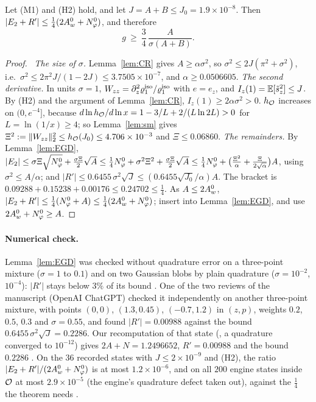 \begin{theorem}\label{thm:EGO}
Let \textup{(M1)} and \textup{(H2)} hold, and let $J=A+B\le J_0=1.9\times10^{-8}$. Then $|E_2+R'|\le\frac14(2A_w^0+N_\varphi^0)$, and therefore
\[
g\ \ge\ \frac34\,\frac{A}{\sigma(A+B)} .
\]
\end{theorem}
\begin{proof}\proofst\
\emph{The size of $\sigma$.} Lemma~\ref{lem:CR} gives $A\ge\alpha\sigma^2$, so $\sigma^2\le2J(\pi^2+\sigma^2)$, i.e.\ $\sigma^2\le2\pi^2J/(1-2J)\le3.7505\times10^{-7}$, and $\alpha\ge0.0506605$.
\emph{The second derivative.} In units $\sigma=1$, $W_{zz}=\partial_z^2\varrho^{\rm iso}_1/\varrho^{\rm iso}_1$ with $e=e_z$, and $I_z(1)=\mathbb{E}[\tilde s_z^2]\le J$.
By (H2) and the argument of Lemma~\ref{lem:CR}, $I_z(1)\ge2\alpha\sigma^2>0$.
$h_{\mathcal O}$ increases on $(0,e^{-4}]$, because $d\ln h_{\mathcal O}/d\ln x=1-3/L+2/(L\ln2L)>0$ for $L=\ln(1/x)\ge4$; so Lemma~\ref{lem:sm} gives $\Xi^2:=\|W_{zz}\|_2^2\le h_{\mathcal O}(J_0)\le4.706\times10^{-3}$ and $\Xi\le0.06860$.
\emph{The remainders.} By Lemma~\ref{lem:EGD}, $|E_2|\le\sigma\Xi\sqrt{N_\varphi^0}+\frac{\sigma\Xi}2\sqrt A\le\frac14N_\varphi^0+\sigma^2\Xi^2+\frac{\sigma\Xi}2\sqrt A\le\frac14N_\varphi^0+\big(\frac{\Xi^2}\alpha+\frac{\Xi}{2\sqrt\alpha}\big)A$, using $\sigma^2\le A/\alpha$; and $|R'|\le0.6455\,\sigma^2\sqrt J\le(0.6455\sqrt{J_0}/\alpha)A$.
The bracket is $0.09288+0.15238+0.00176\le0.24702\le\frac14$.
As $A\le2A_w^0$, $|E_2+R'|\le\frac14(N_\varphi^0+A)\le\frac14(2A_w^0+N_\varphi^0)$; insert into Lemma~\ref{lem:EGD}, and use $2A_w^0+N_\varphi^0\ge A$.
\end{proof}

\paragraph*{Numerical check.}
Lemma~\ref{lem:EGD} was checked without quadrature error on a three-point mixture ($\sigma=1$ to $0.1$) and on two Gaussian blobs by plain quadrature ($\sigma=10^{-2}$, $10^{-4}$): $|R'|$ stays below $3\%$ of its bound \numst.
One of the two reviews of the manuscript (OpenAI ChatGPT) checked it independently on another three-point mixture, with points $(0,0)$, $(1.3,0.45)$, $(-0.7,1.2)$ in $(z,p)$, weights $0.2$, $0.5$, $0.3$ and $\sigma=0.55$, and found $|R'|=0.00988$ against the bound $0.6455\,\sigma^2\sqrt J=0.2286$.
Our recomputation of that state (\code{src/ei\_point.py}, a quadrature converged to $10^{-12}$) gives $2A+N=1.2496652$, $R'=0.00988$ and the bound $0.2286$ \numst.
On the $36$ recorded states with $J\le2\times10^{-9}$ and (H2), the ratio $|E_2+R'|/(2A_w^0+N_\varphi^0)$ is at most $1.2\times10^{-6}$, and on all $200$ engine states inside $\mathcal O$ at most $2.9\times10^{-5}$ (the engine's quadrature defect taken out), against the $\frac14$ the theorem needs \numst.
